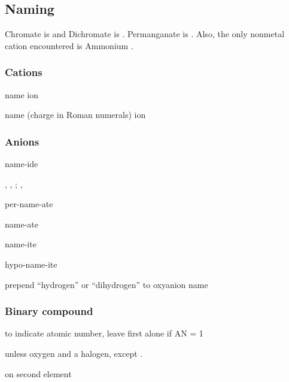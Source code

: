 \begin{mdframed}
\subsection{Naming}
\begin{multicols}{2}
Chromate is 
and Dichromate is . Permanganate is .
Also, the only nonmetal cation encountered is Ammonium .

    \subsubsection{Cations}
    \begin{compactdesc}
    \item[Metal single charge] name ion
    \item[Metal ambiguous charge] name (charge in Roman numerals) ion
    \end{compactdesc}

    \subsubsection{Anions}
    \begin{compactdesc}
    \item[Single] name-ide
    \item[Oxyanions normal sequence] , , ;
        , 
    \item[Oxyanions +1 O count] per-name-ate
    \item[Oxyanions normal O count] name-ate
    \item[Oxyanions -1 O count] name-ite
    \item[Oxyanions -2 O count] hypo-name-ite
    \item[Oxyanions with hydrogen] prepend ``hydrogen'' or ``dihydrogen'' to
        oxyanion name
    \end{compactdesc}

    \subsubsection{Binary compound}
    \begin{compactdesc}
    \item[Greek prefix] to indicate atomic number, leave first alone if AN = 1
    \item[Leftmost first] unless oxygen and a halogen, except .
    \item[Bottommost first]
    \item[Suffix -ide] on second element
    \end{compactdesc}


\end{multicols}
\end{mdframed}
